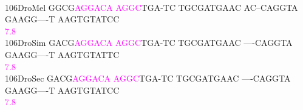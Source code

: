 \documentclass[11pt,twoside,reqno,a4paper]{article}
\begin{document}
{\\
106\hspace*{2\charwidth}DroMel	GGCG\textcolor{magenta}{A}\textcolor{magenta}{G}\textcolor{magenta}{G}\textcolor{magenta}{A}\textcolor{magenta}{C}\textcolor{magenta}{A}	\textcolor{magenta}{A}\textcolor{magenta}{G}\textcolor{magenta}{G}\textcolor{magenta}{C}TGA-TC	TGCGATGAAC	AC--CAGGTA	GAAGG----T	AAGTGTATCC	\\
\hspace*{5\charwidth}\hspace*{7\charwidth}\hspace*{4\charwidth}\textcolor{magenta}{7.8}\hspace*{1\charwidth}\hspace*{1\charwidth}\hspace*{1\charwidth}\hspace*{1\charwidth}\hspace*{1\charwidth}\hspace*{1\charwidth}\\
106\hspace*{2\charwidth}DroSim	GACG\textcolor{magenta}{A}\textcolor{magenta}{G}\textcolor{magenta}{G}\textcolor{magenta}{A}\textcolor{magenta}{C}\textcolor{magenta}{A}	\textcolor{magenta}{A}\textcolor{magenta}{G}\textcolor{magenta}{G}\textcolor{magenta}{C}TGA-TC	TGCGATGAAC	----CAGGTA	GAAGG----T	AAGTGTATTC	\\
\hspace*{5\charwidth}\hspace*{7\charwidth}\hspace*{4\charwidth}\textcolor{magenta}{7.8}\hspace*{1\charwidth}\hspace*{1\charwidth}\hspace*{1\charwidth}\hspace*{1\charwidth}\hspace*{1\charwidth}\hspace*{1\charwidth}\\
106\hspace*{2\charwidth}DroSec	GACG\textcolor{magenta}{A}\textcolor{magenta}{G}\textcolor{magenta}{G}\textcolor{magenta}{A}\textcolor{magenta}{C}\textcolor{magenta}{A}	\textcolor{magenta}{A}\textcolor{magenta}{G}\textcolor{magenta}{G}\textcolor{magenta}{C}TGA-TC	TGCGATGAAC	----CAGGTA	GAAGG----T	AAGTGTATCC	\\
\hspace*{5\charwidth}\hspace*{7\charwidth}\hspace*{4\charwidth}\textcolor{magenta}{7.8}\hspace*{1\charwidth}\hspace*{1\charwidth}\hspace*{1\charwidth}\hspace*{1\charwidth}\hspace*{1\charwidth}\hspace*{1\charwidth}\\
}
\end{document}

